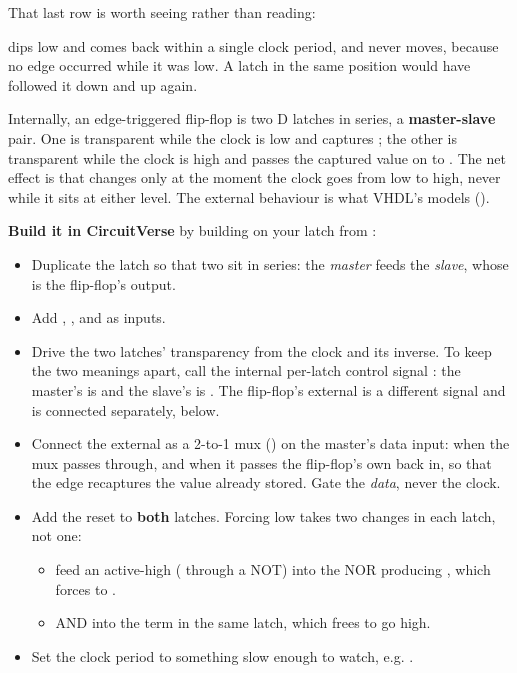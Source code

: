 That last row is worth seeing rather than reading:


 dips low and comes back within a single clock period, and  never moves, because no
edge occurred while it was low. A latch in the same position would have followed it down and up
again.

Internally, an edge-triggered flip-flop is two D latches in series, a \textbf{master-slave} pair.
One is transparent while the clock is low and captures ; the other is transparent while the
clock is high and passes the captured value on to . The net effect is that  changes
only at the moment the clock goes from low to high, never while it sits at either level. The
external behaviour is what VHDL's  models ().

\textbf{Build it in CircuitVerse} by building on your latch from :
\begin{itemize}
  \item Duplicate the latch so that two sit in series: the \emph{master} feeds the \emph{slave},
    whose  is the flip-flop's output.
  \item Add , ,  and  as inputs.
  \item Drive the two latches' transparency from the clock and its inverse. To keep the two
    meanings apart, call the internal per-latch control signal : the master's
     is  and the slave's is . The flip-flop's external
     is a different signal and is connected separately, below.
  \item Connect the external  as a 2-to-1 mux () on the master's
    data input: when  the mux passes  through, and when 
    it passes the flip-flop's own  back in, so that the edge recaptures the value already
    stored. Gate the \emph{data}, never the clock.
  \item Add the reset to \textbf{both} latches. Forcing  low takes two changes in each
    latch, not one:
  \begin{itemize}
    \item feed an active-high  ( through a NOT) into the NOR producing
      , which forces  to .
    \item AND  into the term  in the same latch, which frees
       to go high.
  \end{itemize}
  \item Set the clock period to something slow enough to watch, e.g. .
\end{itemize}

